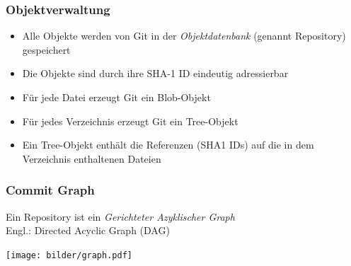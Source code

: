 \documentclass{beamer}
\begin{document}
\begin{frame}
\frametitle{Objektverwaltung}



\begin{itemize}
	\item Alle Objekte werden von Git in der \emph{Objektdatenbank} (genannt Repository) gespeichert
	\item Die Objekte sind durch ihre SHA-1 ID eindeutig adressierbar
\end{itemize}

\begin{itemize}
	\item Für jede Datei erzeugt Git ein Blob-Objekt
	\item Für jedes Verzeichnis erzeugt Git ein Tree-Objekt
	\item Ein Tree-Objekt enthält die Referenzen (SHA1 IDs) auf die in dem Verzeichnis enthaltenen Dateien
\end{itemize}


\end{frame}
\begin{frame}
\frametitle{Commit Graph}



Ein Repository ist ein \emph{Gerichteter Azyklischer Graph}\\
Engl.: Directed Acyclic Graph (DAG)

\begin{center}
\texttt{[image: bilder/graph.pdf]}
\end{center}


\end{frame}
\end{document}
